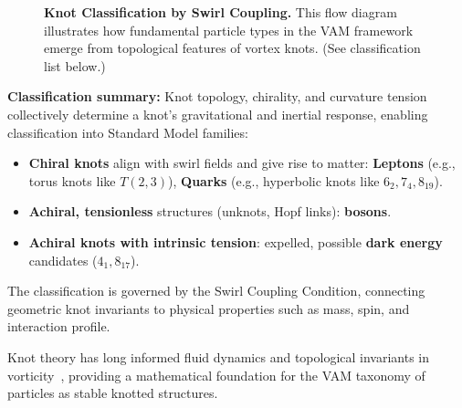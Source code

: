 \begin{figure}[!ht]
{
    }
    \caption{
        \textbf{Knot Classification by Swirl Coupling.}
        This flow diagram illustrates how fundamental particle types in the VAM framework emerge from topological features of vortex knots. (See classification list below.)
    }
    \label{fig:taxonomy}

\end{figure}

\vspace{0.1em}
\textbf{Classification summary:}
Knot topology, chirality, and curvature tension collectively determine a knot’s gravitational and inertial response, enabling classification into Standard Model families:
\begin{itemize}
    \item \textbf{Chiral knots} align with swirl fields and give rise to matter: \textbf{Leptons} (e.g., torus knots like \( T(2,3) \)), \textbf{Quarks} (e.g., hyperbolic knots like \( 6_2, 7_4, 8_{19} \)).
    \item \textbf{Achiral, tensionless} structures (unknots, Hopf links): \textbf{bosons}.
    \item \textbf{Achiral knots with intrinsic tension}: expelled, possible \textbf{dark energy} candidates (\( 4_1, 8_{17} \)).
\end{itemize}
\vspace{0.3em}

The classification is governed by the Swirl Coupling Condition, connecting geometric knot invariants to physical properties such as mass, spin, and interaction profile.

Knot theory has long informed fluid dynamics and topological invariants in vorticity~\cite{knot_theroy_in_fluid}, providing a mathematical foundation for the VAM taxonomy of particles as stable knotted structures.

